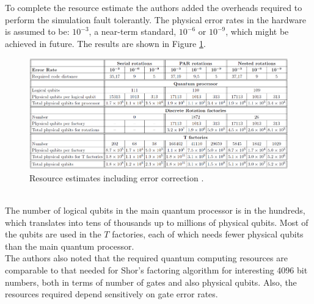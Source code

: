 To complete the resource estimate the authors added the overheads required to perform the simulation fault tolerantly. The physical error rates in the hardware is assumed to be: $10^{-3}$, a near-term standard, $10^{-6}$ or $10^{-9}$, which might be achieved in future. The results are shown in Figure \ref{FeMoco - table 2}.
\begin{figure}[ht]
  \centering
  \includegraphics[width=\textwidth]{figures/FeMoco - table 2.png}
  \caption{Resource estimates including error correction \cite{Reiher2017Jul}.} \label{FeMoco - table 2}
\end{figure} \\
The number of logical qubits in the main quantum processor is in the hundreds, which translates into tens of thousands up to millions of physical qubits. Most of the qubits are used in the $T$ factories, each of which needs fewer physical qubits than the main quantum processor. \\
The authors also noted that the required quantum computing resources are comparable to that needed for Shor's factoring algorithm for interesting 4096 bit numbers, both in terms of number of gates and also physical qubits. Also, the resources required depend sensitively on gate error rates.